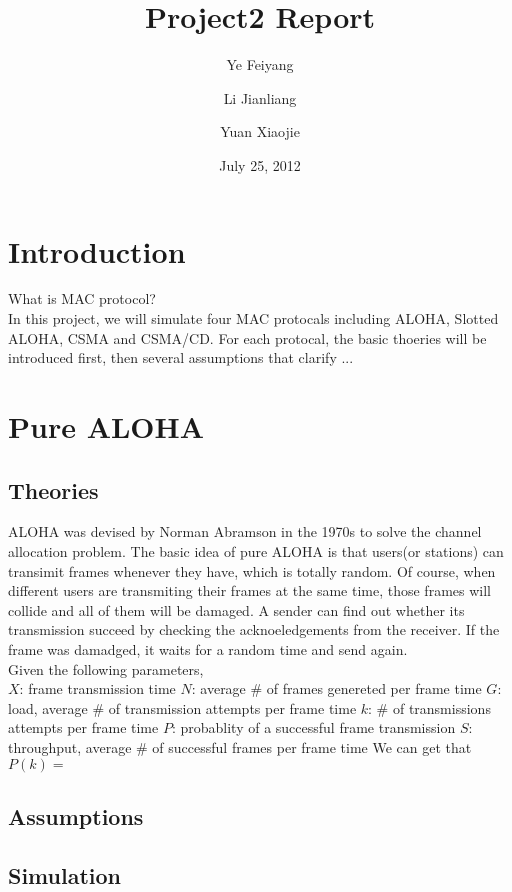 \documentclass[11pt,oneside,a4paper]{report}
\begin{document}
\title{Project2 Report}
\author{Ye Feiyang \and Li Jianliang \and Yuan Xiaojie}
\date{July 25, 2012}
\maketitle

\section*{Introduction}
What is MAC protocol?\\
In this project, we will simulate four MAC protocals including ALOHA, Slotted ALOHA, CSMA and CSMA/CD. For each protocal, the basic thoeries will be introduced first, then several assumptions that clarify ...

\section*{Pure ALOHA}
\subsection*{Theories}
ALOHA was devised by Norman Abramson in the 1970s to solve the channel allocation problem. The basic idea of pure ALOHA is that users(or stations) can transimit frames whenever they have, which is totally random. Of course, when different users are transmiting their frames at the same time, those frames will collide and all of them will be damaged. A sender can find out whether its transmission succeed by checking the acknoeledgements from the receiver. If the frame was damadged, it waits for a random time and send again.\\

Given the following parameters,\\
	\(X\): frame transmission time
	\(N\): average \# of frames genereted per frame time
	\(G\): load, average \# of transmission attempts per frame time
	\(k\): \# of transmissions attempts per frame time
	\(P\): probablity of a successful frame transmission
	\(S\): throughput, average \# of successful frames per frame time
We can get that
	\(P(k) = \)

\subsection*{Assumptions}

\subsection*{Simulation}
\end{document}
